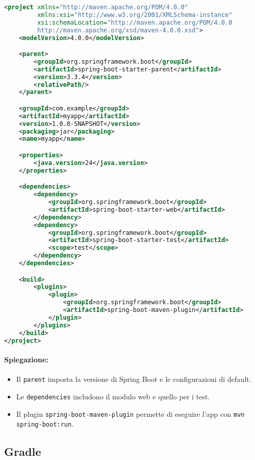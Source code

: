 \begin{lstlisting}[language=xml, caption={Esempio di pom.xml per Spring Boot}]
<project xmlns="http://maven.apache.org/POM/4.0.0"
         xmlns:xsi="http://www.w3.org/2001/XMLSchema-instance"
         xsi:schemaLocation="http://maven.apache.org/POM/4.0.0
         http://maven.apache.org/xsd/maven-4.0.0.xsd">
    <modelVersion>4.0.0</modelVersion>

    <parent>
        <groupId>org.springframework.boot</groupId>
        <artifactId>spring-boot-starter-parent</artifactId>
        <version>3.3.4</version>
        <relativePath/>
    </parent>

    <groupId>com.example</groupId>
    <artifactId>myapp</artifactId>
    <version>1.0.0-SNAPSHOT</version>
    <packaging>jar</packaging>
    <name>myapp</name>

    <properties>
        <java.version>24</java.version>
    </properties>

    <dependencies>
        <dependency>
            <groupId>org.springframework.boot</groupId>
            <artifactId>spring-boot-starter-web</artifactId>
        </dependency>
        <dependency>
            <groupId>org.springframework.boot</groupId>
            <artifactId>spring-boot-starter-test</artifactId>
            <scope>test</scope>
        </dependency>
    </dependencies>

    <build>
        <plugins>
            <plugin>
                <groupId>org.springframework.boot</groupId>
                <artifactId>spring-boot-maven-plugin</artifactId>
            </plugin>
        </plugins>
    </build>
</project>
\end{lstlisting}
\paragraph{Spiegazione:}
\begin{itemize}
	\item Il \texttt{parent} imposta la versione di Spring Boot e le configurazioni di default.
	\item Le \texttt{dependencies} includono il modulo web e quello per i test.
	\item Il plugin \texttt{spring-boot-maven-plugin} permette di eseguire l'app con \texttt{mvn spring-boot:run}.
\end{itemize}
\subsection{Gradle}

